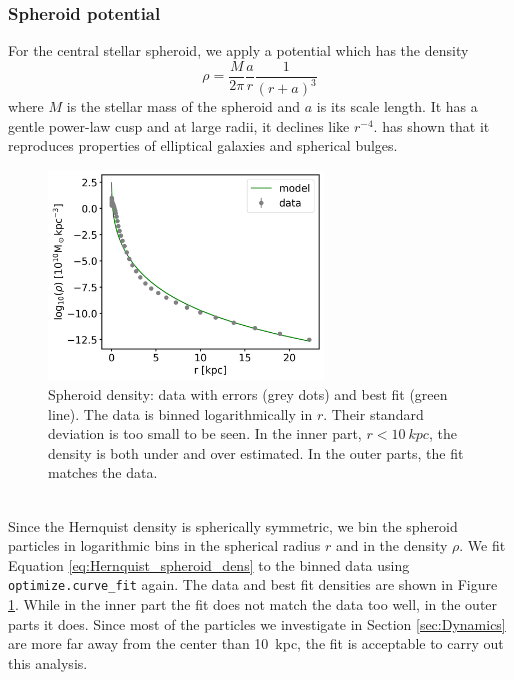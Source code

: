 \subsubsection{Spheroid potential}\label{subsubsec:spher_pot}
For the central stellar spheroid, we apply a \citet{Hernquistprofile} potential which has the density 
\begin{equation}\label{eq:Hernquist_spheroid_dens}
    \rho = \frac{M}{2\pi}\frac{a}{r}\frac{1}{(r+a)^3}
\end{equation}
where $M$ is the stellar mass of the spheroid and $a$ is its scale length. It has a gentle power-law cusp and at large radii, it declines like $r^{-4}$. \citet{Hernquistprofile} has shown that it reproduces properties of elliptical galaxies and spherical bulges. 
\\
\begin{figure}
\captionsetup{format=plain}
    \centering
    \includegraphics[width=0.65\textwidth]{plots/Auriga/spheroid_density_fit_snap_127.png}
    \caption{Spheroid density: data with errors (grey dots) and best fit (green line). The data is binned logarithmically in $r$. Their standard deviation is too small to be seen. In the inner part, $r<\SI{10}{kpc}$, the density is both under and over estimated. In the outer parts, the fit matches the data.}
    \label{fig:spheroid_fit}
\end{figure}
\\Since the Hernquist density is spherically symmetric, we bin the spheroid particles in logarithmic bins in the spherical radius $r$ and in the density $\rho$. We fit Equation \ref{eq:Hernquist_spheroid_dens} to the binned data using \texttt{optimize.curve\_fit} again. The data and best fit densities are shown in Figure \ref{fig:spheroid_fit}. While in the inner part the fit does not match the data too well, in the outer parts it does. Since most of the particles we investigate in Section \ref{sec:Dynamics} are more far away from the center than \SI{10}{kpc}, the fit is acceptable to carry out this analysis.

